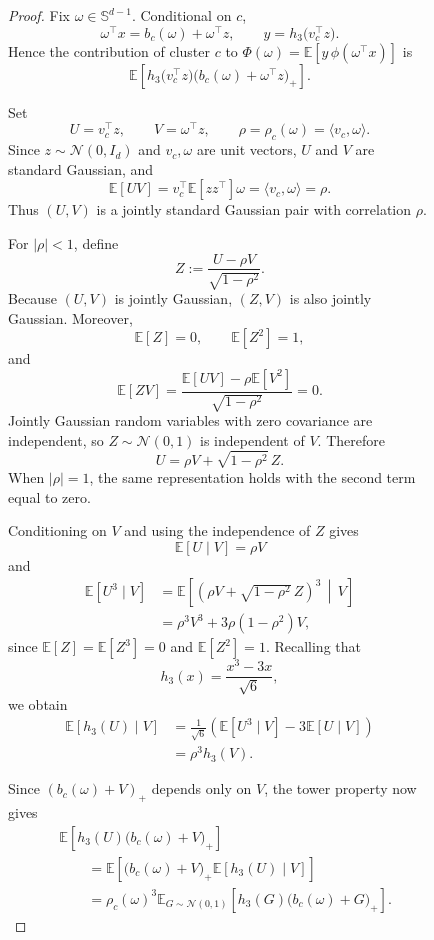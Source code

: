 \documentclass{article}
\begin{document}
\begin{figure}
\begin{proof}
Fix $\omega\in\mathbb S^{d-1}$. Conditional on $c$,
\[
    \omega^\top x
    =b_c(\omega)
      +\omega^\top z,
    \qquad
    y=h_3\bigl(v_c^\top z\bigr).
\]
Hence the contribution of cluster $c$ to $\Phi(\omega) = \mathbb E\left[y\,
      \phi(\omega^\top x)\right]$ is
\[\mathbb E\left[
        h_3\bigl(v_c^\top z\bigr)
        \bigl(b_c(\omega)
          +\omega^\top z\bigr)_+
    \right].
\]

Set
\[
    U=v_c^\top z,
    \qquad
    V=\omega^\top z,
    \qquad
    \rho=\rho_c(\omega)
    =\langle v_c,\omega\rangle.
\]
Since $z\sim\mathcal N(0,I_d)$ and
$v_c,\omega$ are unit vectors,
$U$ and $V$ are standard Gaussian, and
\[
    \mathbb E[UV]
    =
    v_c^\top
      \mathbb E[zz^\top]\omega
    =
    \langle v_c,\omega\rangle
    =
    \rho.
\]
Thus $(U,V)$ is a jointly standard Gaussian pair with correlation $\rho$.

For $|\rho|<1$, define
\[
    Z:=\frac{U-\rho V}{\sqrt{1-\rho^2}}.
\]
Because $(U,V)$ is jointly Gaussian, $(Z,V)$ is also jointly Gaussian.
Moreover,
\[
    \mathbb E[Z]=0,
    \qquad
    \mathbb E[Z^2]=1,
\]
and
\[
    \mathbb E[ZV]
    =
    \frac{\mathbb E[UV]-\rho\mathbb E[V^2]}
         {\sqrt{1-\rho^2}}
    =0.
\]
Jointly Gaussian random variables with zero covariance are independent, so
$Z\sim\mathcal N(0,1)$ is independent of $V$. Therefore
\[
    U=\rho V+\sqrt{1-\rho^2}\,Z.
\]
When $|\rho|=1$, the same representation holds with the second term equal
to zero.

Conditioning on $V$ and using the independence of $Z$ gives
\[
    \mathbb E[U\mid V]=\rho V
\]
and
\begin{align*}
    \mathbb E[U^3\mid V]
    &=
    \mathbb E\left[
        \left(\rho V+\sqrt{1-\rho^2}\,Z\right)^3
        \,\middle|\,V
    \right]\\
    &=
    \rho^3V^3+3\rho(1-\rho^2)V,
\end{align*}
since $\mathbb E[Z]=\mathbb E[Z^3]=0$ and $\mathbb E[Z^2]=1$.
Recalling that
\[
    h_3(x)=\frac{x^3-3x}{\sqrt6},
\]
we obtain
\begin{align*}
    \mathbb E[h_3(U)\mid V]
    &=
    \frac{1}{\sqrt6}
    \left(
        \mathbb E[U^3\mid V]
        -3\mathbb E[U\mid V]
    \right)\\
    &=
    \rho^3 h_3(V).
\end{align*}

Since $(b_c(\omega)+V)_+$ depends only on $V$, the tower property now gives
\begin{align*}
    &\mathbb E\left[
        h_3(U)\bigl(b_c(\omega)+V\bigr)_+
    \right]\\
    &\qquad=
    \mathbb E\left[
        \bigl(b_c(\omega)+V\bigr)_+
        \mathbb E[h_3(U)\mid V]
    \right]\\
    &\qquad=
    \rho_c(\omega)^3
    \mathbb E_{G\sim\mathcal N(0,1)}
    \left[
        h_3(G)\bigl(b_c(\omega)+G\bigr)_+
    \right].
\end{align*}


\end{proof}
\end{figure}
\end{document}
